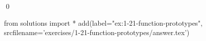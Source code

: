 
\begin{ex}
  \label{ex:1-21-function-prototypes}
  
  \qed
\end{ex}
\begin{python0}
from solutions import *
add(label="ex:1-21-function-prototypes",
    srcfilename='exercises/1-21-function-prototypes/answer.tex')
\end{python0}
